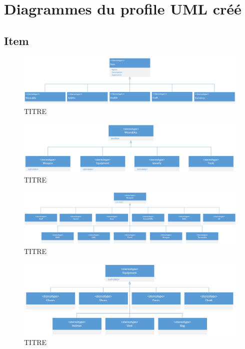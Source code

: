 \appendix
\chapter{Diagrammes du profile UML créé}

\section*{Item}
\begin{figure}[H]
    \centering
    \includegraphics[width=14cm]{10_img/chap5/01_00_item.PNG} 
    \caption{TITRE}
\end{figure}
\begin{figure}[H]
    \centering
    \includegraphics[width=14cm]{10_img/chap5/01_01_wearable.PNG} 
    \caption{TITRE}
\end{figure}
\begin{figure}[H]
    \centering
    \includegraphics[width=14cm]{10_img/chap5/01_01_01_weapon.PNG} 
    \caption{TITRE}
\end{figure}
\begin{figure}[H]
    \centering
    \includegraphics[width=14cm]{10_img/chap5/01_01_02_equipment.PNG} 
    \caption{TITRE}
\end{figure}

